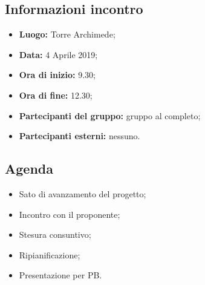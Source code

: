 \subsection{Informazioni incontro}
\begin{itemize}
	\item { \textbf{Luogo:} Torre Archimede};
	\item { \textbf{Data:} 4 Aprile 2019};
	\item { \textbf{Ora di inizio:} 9.30};
	\item { \textbf{Ora di fine:} 12.30};
	\item { \textbf{Partecipanti del gruppo:} gruppo al completo};
	\item { \textbf{Partecipanti esterni:} nessuno}.
\end{itemize}


\subsection{Agenda}
\begin{itemize}
	\item {Sato di avanzamento del progetto;}
	\item {Incontro con il proponente;}
	\item {Stesura consuntivo;}
	\item {Ripianificazione;}
	\item {Presentazione per PB.}
\end{itemize}

